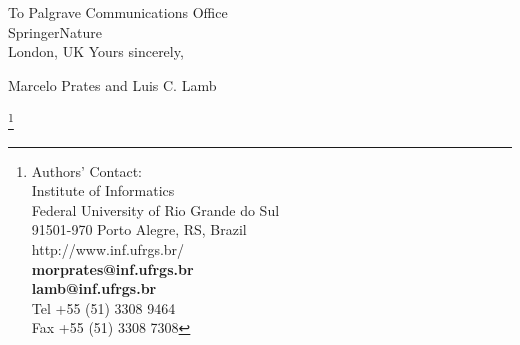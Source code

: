 \documentclass[10pt]{letter} %
\begin{document}
\begin{letter}{To Palgrave Communications Office\\
SpringerNature\\
London, UK
 }
Yours sincerely,\\



\begin{flushleft}
Marcelo Prates and Luis C. Lamb
 \end{flushleft}


\let\thefootnote\relax\footnote{Authors' Contact:\\
Institute of Informatics \\
Federal University of Rio Grande do Sul\\ 
91501-970 Porto Alegre, RS, Brazil \\
http://www.inf.ufrgs.br/  \\
\textbf{morprates@inf.ufrgs.br}\\
\textbf{lamb@inf.ufrgs.br}\\
Tel +55 (51) 3308 9464 \\
Fax +55 (51) 3308 7308}



\end{letter}
\end{document}
